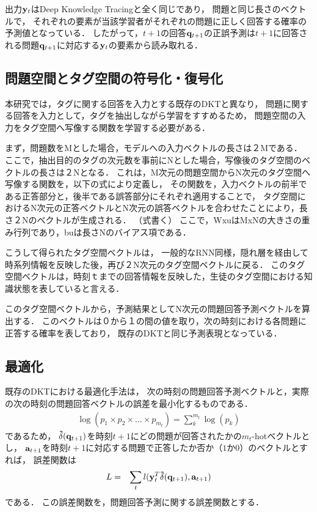 出力${\bf y}_t$はDeep Knowledge Tracingと全く同じであり，
問題と同じ長さのベクトルで，
それぞれの要素が当該学習者がそれぞれの問題に正しく回答する確率の予測値となっている．
したがって，$t+1$の回答${\bf q}_{t+1}$の正誤予測は$t+1$に回答される問題${\bf q}_{t+1}$に対応する${\bf y}_t$の要素から読み取れる．



\subsection{問題空間とタグ空間の符号化・復号化}
本研究では，タグに関する回答を入力とする既存のDKTと異なり，
問題に関する回答を入力として，タグを抽出しながら学習をすすめるため，
問題空間の入力をタグ空間へ写像する関数を学習する必要がある．

まず，問題数をMとした場合，モデルへの入力ベクトルの長さは２Mである．
ここで，抽出目的のタグの次元数を事前にNとした場合，写像後のタグ空間のベクトルの長さは２Nとなる．
これは，M次元の問題空間からN次元のタグ空間へ写像する関数を，以下の式により定義し，
その関数を，入力ベクトルの前半である正答部分と，後半である誤答部分にそれぞれ適用することで，
タグ空間におけるN次元の正答ベクトルとN次元の誤答ベクトルを合わせたことにより，長さ２Nのベクトルが生成される．
（式書く）
ここで，WxuはMxNの大きさの重み行列であり，buは長さNのバイアス項である．


こうして得られたタグ空間ベクトルは，
一般的なRNN同様，隠れ層を経由して時系列情報を反映した後，再び２N次元のタグ空間ベクトルに戻る．
このタグ空間ベクトルは，時刻ｔまでの回答情報を反映した，生徒のタグ空間における知識状態を表していると言える．

このタグ空間ベクトルから，予測結果としてN次元の問題回答予測ベクトルを算出する．
このベクトルは０から１の間の値を取り，次の時刻における各問題に正答する確率を表しており，
既存のDKTと同じ予測表現となっている．



\subsection{最適化}
既存のDKTにおける最適化手法は，
次の時刻の問題回答予測ベクトルと，実際の次の時刻の問題回答ベクトルの誤差を最小化するものである．
\begin{eqnarray}
	\log(p_1 \times p_2 \times \dots \times p_{m_t}) = \sum_{k}^{m_t} \log(p_k)
\end{eqnarray}
であるため，
${\bf\tilde{ \delta}}({\bf q}_{t+1})$を時刻$t+1$にどの問題が回答されたかの$m_t$-hotベクトルとし，
${\bf a}_{t+1}$を時刻$t+1$に対応する問題で正答したか否か（$1$か$0$）のベクトルとすれば，
誤差関数は
\begin{eqnarray}
L &=& \sum_t l({\bf y}_t^T {\bf \tilde{\delta}}({\bf q}_{t+1}), {\bf a}_{t+1})
\end{eqnarray}
である．
この誤差関数を，問題回答予測に関する誤差関数とする．


